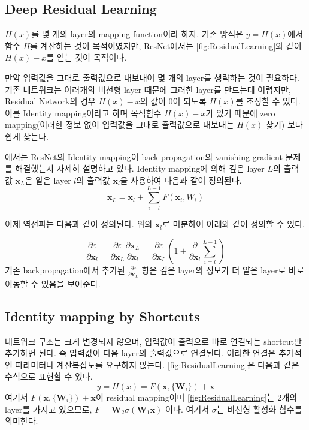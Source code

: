 \documentclass[extendedabs]{bmvc2k}
\begin{document}
\subsection{Deep Residual Learning}
$H(x)$를 몇 개의 layer의 mapping function이라 하자. 기존 방식은 $y=H(x)$에서 함수 $H$를 계산하는 것이 목적이였지만, ResNet에서는 \ref{fig:ResidualLearning}와 같이 $H(x)-x$를 얻는 것이 목적이다. 

만약 입력값을 그대로 출력값으로 내보내어 몇 개의 layer를 생략하는 것이 필요하다. 기존 네트워크는 여러개의 비선형 layer 때문에 그러한 layer를 만드는데 어렵지만, Residual Network의 경우 $H(x)-x$의 값이 0이 되도록 $H(x)$를 조정할 수 있다. 이를 Identity mapping이라고 하며 목적함수 $H(x)-x$가 있기 때문에 zero mapping(이러한 정보 없이 입력값을 그대로 출력값으로 내보내는 $H(x)$ 찾기) 보다 쉽게 찾는다.

\cite{he2016identitymappingsdeepresidual}에서는 ResNet의 Identity mapping이 back propagation의 vanishing gradient 문제를 해결했는지 자세히 설명하고 있다. Identity mapping에 의해 깊은 layer $L$의 출력값 $\textbf{x}_L$은 얕은 layer $l$의 출력값 $\textbf{x}_l$을 사용하여 다음과 같이 정의된다.
$$
\textbf{x}_L = \textbf{x}_l + \sum\limits_{i=l}^{L-1} F(\textbf{x}_i,W_i)
$$

이제 역전파는 다음과 같이 정의된다. 위의 $\textbf{x}_l$로 미분하여 아래와 같이 정의할 수 있다.

$$
\frac{\partial\varepsilon}{\partial\textbf{x}_l} = \frac{\partial\varepsilon}{\partial\textbf{x}_L}
\frac{\partial\textbf{x}_L}{\partial\textbf{x}_l}=
\frac{\partial\varepsilon}{\partial\textbf{x}_L}(1+ \frac{\partial}{\partial\textbf{x}_l}\sum\limits_{i=l}^{L-1})
$$
기존 backpropagation에서 추가된 $\frac{\partial\varepsilon}{\partial\textbf{x}_L}$ 항은 깊은 layer의 정보가 더 얕은 layer로 바로 이동할 수 있음을 보여준다.
\subsection{Identity mapping by Shortcuts}
네트워크 구조는 크게 변경되지 않으며, 입력값이 출력으로 바로 연결되는 shortcut만 추가하면 된다. 즉 입력값이 다음 layer의 출력값으로 연결된다. 이러한 연결은 추가적인 파라미터나 계산복잡도를 요구하지 않는다. \ref{fig:ResidualLearning}은 다음과 같은 수식으로 표현할 수 있다.
$$
y=H(x) = F(\textbf{x},\{ \textbf{W}_i \})+\textbf{x}
$$
여기서 $ F(\textbf{x},\{\textbf{W}_i\})+\textbf{x}$이 residual mapping이며 \ref{fig:ResidualLearning}는 2개의 layer를 가지고 있으므로, $F=\textbf{W}_2\sigma(\textbf{W}_1\textbf{x})$ 이다. 여기서 $\sigma$는 비선형 활성화 함수를 의미한다.
\end{document}
